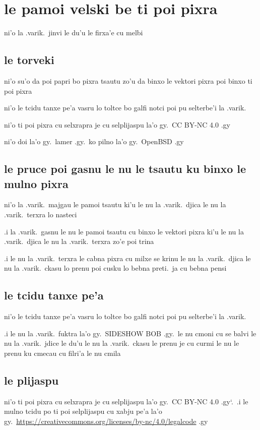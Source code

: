 \documentclass{report}
\newcommand\sds{\spacefactor\sfcode`.\ \space}
\begin{document}
\section{le pamoi velski be ti poi pixra}
ni'o la .varik.\ jinvi le du'u le firxa'e cu melbi

\subsection{le torveki}
ni'o su'o da poi papri bo pixra tsautu zo'u da binxo le vektori pixra poi binxo ti poi pixra

ni'o le tcidu tanxe pe'a vasru lo toltce bo galfi notci poi pu selterbe'i la .varik.

ni'o ti poi pixra cu selxrapra je cu selplijaspu la'o gy.\ CC BY-NC 4.0 .gy

ni'o doi la'o gy.\ lamer .gy.\ ko pilno la'o gy.\ OpenBSD .gy

\subsection{le pruce poi gasnu le nu le tsautu ku binxo le mulno pixra}
ni'o la .varik.\ majgau le pamoi tsautu ki'u le nu la .varik.\ djica le nu la .varik.\ terxra lo nasteci

.i la .varik.\ gasnu le nu le pamoi tsautu cu binxo le vektori pixra ki'u le nu la .varik.\ djica le nu la .varik.\ terxra zo'e poi trina

.i le nu la .varik.\ terxra le cabna pixra cu milxe se krinu le nu la .varik.\ djica le nu la .varik.\ ckasu lo prenu poi cusku lo bebna preti.\ ja cu bebna pensi

\subsection{le tcidu tanxe pe'a}
ni'o le tcidu tanxe pe'a vasru lo toltce bo galfi notci poi pu selterbe'i la .varik.

.i le nu la .varik.\ fuktra la'o gy.\ SIDESHOW BOB .gy.\ le nu cmoni cu se balvi le nu la .varik.\ jdice le du'u le nu la .varik.\ ckasu le prenu je cu curmi le nu le prenu ku cmecau cu filri'a le nu cmila

\subsection{le plijaspu}
ni'o ti poi pixra cu selxrapra je cu selplijaspu la'o gy.\ CC BY-NC 4.0 .gy\sds  .i le mulno tcidu po ti poi selplijaspu cu xabju pe'a la'o gy.\ \url{https://creativecommons.org/licenses/by-nc/4.0/legalcode} .gy
\end{document}
